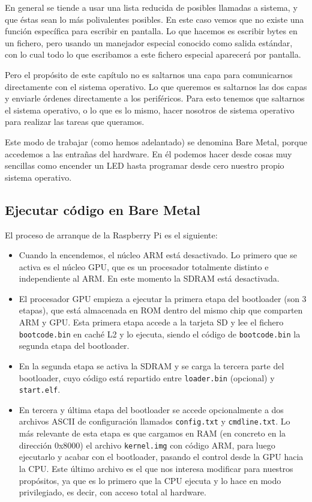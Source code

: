 En general se tiende a usar una lista reducida de posibles llamadas
a sistema, y que éstas sean lo más polivalentes posibles. En este
caso vemos que no existe una función específica para escribir en
pantalla. Lo que hacemos es escribir bytes en un fichero, pero usando
un manejador especial conocido como salida estándar, con lo cual todo
lo que escribamos a este fichero especial aparecerá por pantalla.

Pero el propósito de este capítulo no es saltarnos una capa
para comunicarnos directamente con el sistema operativo. Lo que queremos
es saltarnos las dos capas y enviarle órdenes directamente a los periféricos.
Para esto tenemos que saltarnos el sistema operativo, o lo que es lo mismo,
hacer nosotros de sistema operativo para realizar las tareas que queramos.

Este modo de trabajar (como hemos adelantado) se denomina Bare Metal, porque
accedemos a las entrañas del hardware. En él podemos hacer desde cosas
muy sencillas como encender un LED hasta programar desde cero nuestro propio
sistema operativo.

\subsection{Ejecutar código en Bare Metal}

El proceso de arranque de la Raspberry Pi es el siguiente:

\begin{itemize}
  \item Cuando la encendemos, el núcleo ARM está desactivado. Lo primero que se activa es el
        núcleo GPU, que es un procesador totalmente distinto e independiente al ARM. En este
        momento la SDRAM está desactivada.
  \item El procesador GPU empieza a ejecutar la primera etapa del bootloader (son 3 etapas), que
        está almacenada en ROM dentro del mismo chip que comparten ARM y GPU. Esta primera etapa
        accede a la tarjeta SD y lee el fichero {\tt bootcode.bin} en caché L2 y lo ejecuta,
        siendo el código de {\tt bootcode.bin} la segunda etapa del bootloader.
  \item En la segunda etapa se activa la SDRAM y se carga la tercera parte del bootloader, cuyo
        código está repartido entre {\tt loader.bin} (opcional) y {\tt start.elf}.
  \item En tercera y última etapa del bootloader se accede opcionalmente a dos archivos ASCII de
        configuración llamados {\tt config.txt} y {\tt cmdline.txt}. Lo más relevante de esta
        etapa es que cargamos en RAM (en concreto en la dirección 0x8000) el archivo
        {\tt kernel.img} con código ARM, para luego ejecutarlo y acabar con el bootloader, pasando
        el control desde la GPU hacia la CPU.
        Este último archivo es el que nos interesa modificar para nuestros propósitos, ya que es
        lo primero que la CPU ejecuta y lo hace en modo privilegiado, es decir, con acceso total
        al hardware.
\end{itemize}

